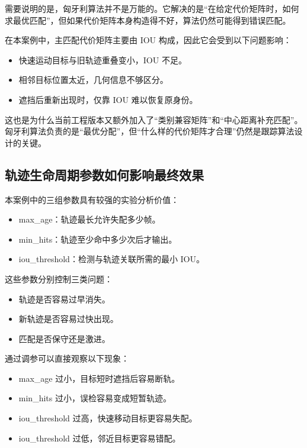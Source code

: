 需要说明的是，匈牙利算法并不是万能的。它解决的是``在给定代价矩阵时，如何求最优匹配''，但如果代价矩阵本身构造得不好，算法仍然可能得到错误匹配。

在本案例中，主匹配代价矩阵主要由 IOU 构成，因此它会受到以下问题影响：

\begin{itemize}
\tightlist
\item
  快速运动目标与旧轨迹重叠变小，IOU 不足。
\item
  相邻目标位置太近，几何信息不够区分。
\item
  遮挡后重新出现时，仅靠 IOU 难以恢复原身份。
\end{itemize}

这也是为什么当前工程版本又额外加入了``类别兼容矩阵''和``中心距离补充匹配''。匈牙利算法负责的是``最优分配''，但``什么样的代价矩阵才合理''仍然是跟踪算法设计的关键。

\subsection{轨迹生命周期参数如何影响最终效果}\label{src-experiment-case2-h56}

本案例中的三组参数具有较强的实验分析价值：

\begin{itemize}
\tightlist
\item
  max\_age：轨迹最长允许失配多少帧。
\item
  min\_hits：轨迹至少命中多少次后才输出。
\item
  iou\_threshold：检测与轨迹关联所需的最小 IOU。
\end{itemize}

这些参数分别控制三类问题：

\begin{itemize}
\tightlist
\item
  轨迹是否容易过早消失。
\item
  新轨迹是否容易过快出现。
\item
  匹配是否保守还是激进。
\end{itemize}

通过调参可以直接观察以下现象：

\begin{itemize}
\tightlist
\item
  max\_age 过小，目标短时遮挡后容易断轨。
\item
  min\_hits 过小，误检容易变成短暂轨迹。
\item
  iou\_threshold 过高，快速移动目标更容易失配。
\item
  iou\_threshold 过低，邻近目标更容易错配。
\end{itemize}

